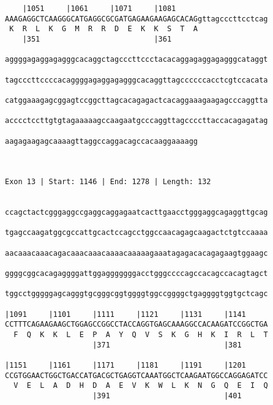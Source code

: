 \documentclass{article}
\begin{document}
\begin{Verbatim}
    |1051     |1061     |1071     |1081                     
AAAGAGGCTCAAGGGCATGAGGCGCGATGAGAAGAAGAGCACAGgttagcccttcctcag
 K  R  L  K  G  M  R  R  D  E  K  K  S  T  A                
    |351                          |361                      
  
aggggagaggagagggcacaggctagcccttccctacacaggagaggagagggcataggt
                                                            
tagcccttccccacaggggagaggagagggcacaggttagccccccacctcgtccacata
                                                            
catggaaagagcggagtccggcttagcacagagactcacaggaaagaagagcccaggtta
                                                            
acccctccttgtgtagaaaaagccaagaatgcccaggttagccccttaccacagagatag
                                                            
aagagaagagcaaaagttaggccaggacagccacaaggaaaagg
                                            
                                            
 
Exon 13 | Start: 1146 | End: 1278 | Length: 132


ccagctactcgggaggccgaggcaggagaatcacttgaacctgggaggcagaggttgcag
                                                            
tgagccaagatggcgccattgcactccagcctggccaacagagcaagactctgtccaaaa
                                                            
aacaaacaaacagacaaacaaacaaaacaaaaagaaatagagacacagagaagtggaagc
                                                            
ggggcggcacagaggggattggagggggggacctgggccccagccacagccacagtagct
                                                            
tggcctgggggagcagggtgcgggcggtggggtggccggggctgaggggtggtgctcagc
                                                            
|1091     |1101     |1111     |1121     |1131     |1141     
CCTTTCAGAAGAAGCTGGAGCCGGCCTACCAGGTGAGCAAAGGCCACAAGATCCGGCTGA
  F  Q  K  K  L  E  P  A  Y  Q  V  S  K  G  H  K  I  R  L  T
                    |371                          |381      
  
|1151     |1161     |1171     |1181     |1191     |1201     
CCGTGGAACTGGCTGACCATGACGCTGAGGTCAAATGGCTCAAGAATGGCCAGGAGATCC
  V  E  L  A  D  H  D  A  E  V  K  W  L  K  N  G  Q  E  I  Q
                    |391                          |401      
  

\end{Verbatim}
\end{document}

